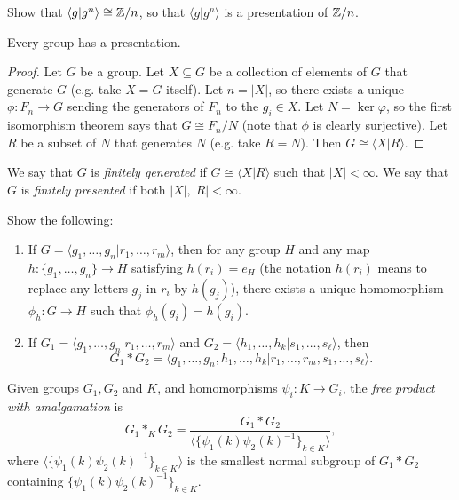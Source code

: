 \begin{exercise}
  Show that $\langle g | g^n \rangle \cong \mathbb{Z} / n$, so that $\langle g | g^n \rangle$ is a
  presentation of $\mathbb{Z} / n$.
\end{exercise}

\begin{lemma}
  Every group has a presentation.
\end{lemma}

\begin{proof}
  Let $G$ be a group. Let $X \subseteq G$ be a
  collection of elements of $G$ that generate $G$
  (e.g. take $X = G$ itself). Let $n = |X|$, so
  there exists a unique $\phi : F_n \to G$
  sending the generators of $F_n$ to the $g_i \in X$.
  Let $N = \ker \varphi$, so the first isomorphism
  theorem says that $G \cong F_n / N$ (note that
  $\phi$ is clearly surjective). Let
  $R$ be a subset of $N$ that generates $N$
  (e.g. take $R = N$). Then
  $G \cong \langle X | R \rangle$.
\end{proof}

\begin{definition}
  We say that $G$ is \emph{finitely generated}
  if $G \cong \langle X | R \rangle$ such that
  $|X| < \infty$. We say that $G$ is
  \emph{finitely presented} if both
  $|X|, |R| < \infty$.
\end{definition}

\begin{exercise}
   Show the following:
   \begin{enumerate}
     \item If $G = \langle g_1, \dots, g_n | r_1, \dots, r_m \rangle$, then for any group $H$ and
       any map $h : \{g_1, \dots, g_n\} \to H$
       satisfying $h(r_i) = e_H$ (the notation
       $h(r_i)$ means to replace
       any letters $g_j$ in $r_i$ by $h(g_j)$),
       there exists a unique homomorphism
       $\phi_h : G \to H$ such that
       $\phi_h(g_i) = h(g_i)$.
     \item If $G_1 = \langle g_1, \dots, g_n | r_1, \dots, r_m \rangle$ and
       $G_2 = \langle h_1, \dots, h_k | s_1, \dots, s_\ell \rangle$, then
       \[
         G_1 * G_2 = \langle g_1, \dots, g_n, h_1, \dots, h_k | r_1, \dots, r_m, s_1, \dots, s_\ell \rangle.
       \]
   \end{enumerate}
\end{exercise}

\begin{definition}
  Given groups $G_1, G_2$ and $K$, and homomorphisms
  $\psi_i : K \to G_i$, the \emph{free product with amalgamation}
  is
  \[
  G_1 *_K G_2 = \frac{G_1 * G_2}{\langle \{\psi_1(k) \psi_2(k)^{-1}\}_{k \in K} \rangle},
  \]
  where $\langle \{\psi_1(k) \psi_2(k)^{-1}\}_{k \in K} \rangle$ is the
  smallest normal subgroup of $G_1 * G_2$ containing
  $\{\psi_1(k) \psi_2(k)^{-1}\}_{k \in K}$.
\end{definition}

